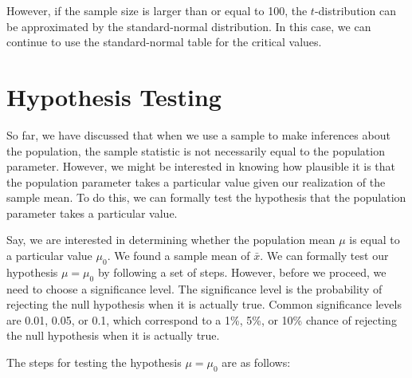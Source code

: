 \documentclass{./../../Latex/handout}
\begin{document}
However, if the sample size is larger than or equal to 100, the $t$-distribution can be approximated by the standard-normal distribution. In this case, we can continue to use the standard-normal table for the critical values. 

\section{Hypothesis Testing}
So far, we have discussed that when we use a sample to make inferences about the population, the sample statistic is not necessarily equal to the population parameter. However, we might be interested in knowing how plausible it is that the population parameter takes a particular value given our realization of the sample mean. To do this, we can formally test the hypothesis that the population parameter takes a particular value.

Say, we are interested in determining whether the population mean $\mu$ is equal to a particular value $\mu_0$. We found a sample mean of $\bar{x}$. We can formally test our hypothesis $\mu=\mu_0$ by following a set of steps. However, before we proceed, we need to choose a significance level. The significance level is the probability of rejecting the null hypothesis when it is actually true. Common significance levels are 0.01, 0.05, or 0.1, which correspond to a 1\%, 5\%, or 10\% chance of rejecting the null hypothesis when it is actually true.

The steps for testing the hypothesis $\mu=\mu_0$ are as follows:
\end{document}
